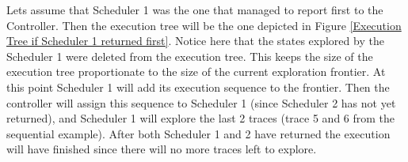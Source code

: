 Lets assume that Scheduler 1 was the one that managed to report first to the Controller. Then the execution tree will be the one
depicted in Figure \ref{Execution Tree if Scheduler 1 returned first}. Notice here that the states explored by the Scheduler 1
were deleted from the execution tree. This keeps the size of the execution tree proportionate to the size of 
the current exploration frontier. At this point Scheduler 1 will add its execution sequence to the frontier. Then the 
controller will assign this sequence to Scheduler 1 (since Scheduler 2 has not yet returned), and Scheduler 1 will explore
the last 2 traces (trace 5 and 6 from the sequential example). After both Scheduler 1 and 2 have returned the execution 
will have finished since there will no more traces left to explore.


